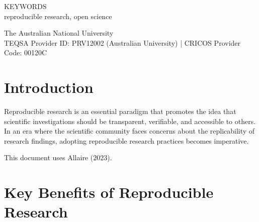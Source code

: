 \documentclass[
  a4paper,
  oneside,
  open=any]{scrbook}
\renewcommand*\contentsname{Table of contents}
\newcommand\contentsname{Table of contents}
\begin{document}
\begin{frontmatter}
\begin{titlepage}
\begin{minipage}[b][\textheight][s]{\textwidth}
\begin{titlepagebox}
  {\textcolor{anugold}{\MakeUppercase{Keywords}}}\\
  reproducible research, open science

  \end{titlepagebox}

  \vspace{2\baselineskip}






  \vfill



  \vspace{1\baselineskip}

  The Australian National University\\{\footnotesize TEQSA Provider ID: PRV12002 (Australian University) | CRICOS Provider Code: 00120C}

  \end{minipage}
  \restoregeometry

  \end{titlepage}
  \end{frontmatter}

\restoregeometry

\cleardoublepage
{}


\renewcommand*\contentsname{Table of contents}
{
\setcounter{tocdepth}{2}
\tableofcontents
}

\mainmatter
\section{Introduction}\label{introduction}

Reproducible research is an essential paradigm that promotes the idea
that scientific investigations should be transparent, verifiable, and
accessible to others. In an era where the scientific community faces
concerns about the replicability of research findings, adopting
reproducible research practices becomes imperative.

This document uses Allaire (2023).

\section{Key Benefits of Reproducible
Research}\label{key-benefits-of-reproducible-research}
\end{document}
